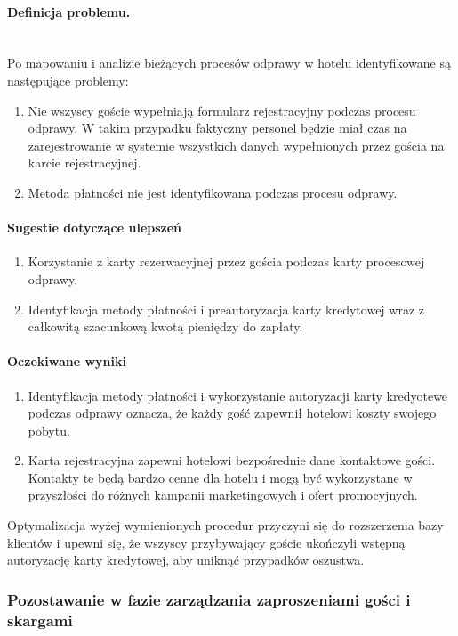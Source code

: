 \documentclass[a4paper, 12pt]{article}
\begin{document}
\paragraph{Definicja problemu.}\mbox{}\\
Po mapowaniu i analizie bieżących procesów odprawy w hotelu identyfikowane są następujące problemy:
\begin{enumerate}
	\item Nie wszyscy goście wypełniają formularz rejestracyjny podczas procesu odprawy. W takim przypadku faktyczny personel będzie miał czas na zarejestrowanie w systemie wszystkich danych wypełnionych przez gościa na karcie rejestracyjnej.
	\item Metoda płatności nie jest identyfikowana podczas procesu odprawy.
\end{enumerate}
\paragraph{Sugestie dotyczące ulepszeń}
\begin{enumerate}
	\item Korzystanie z karty rezerwacyjnej przez gościa podczas karty procesowej odprawy.
	\item Identyfikacja metody płatności i preautoryzacja karty kredytowej wraz z całkowitą szacunkową kwotą pieniędzy do zapłaty.
\end{enumerate}
\paragraph{Oczekiwane wyniki}
\begin{enumerate}
	\item Identyfikacja metody płatności i wykorzystanie autoryzacji karty kredyotewe podczas odprawy oznacza, że każdy gość zapewnił hotelowi koszty swojego pobytu.
	\item Karta rejestracyjna zapewni hotelowi bezpośrednie dane kontaktowe gości. Kontakty te będą bardzo cenne dla hotelu i mogą być wykorzystane w przyszłości do różnych kampanii marketingowych i ofert promocyjnych.
\end{enumerate}

\hspace{1cm} Optymalizacja wyżej wymienionych procedur przyczyni się do rozszerzenia bazy klientów i upewni się, że wszyscy przybywający goście ukończyli wstępną autoryzację karty kredytowej, aby uniknąć przypadków oszustwa.

\subsubsection{Pozostawanie w fazie zarządzania zaproszeniami gości i skargami}
\end{document}
